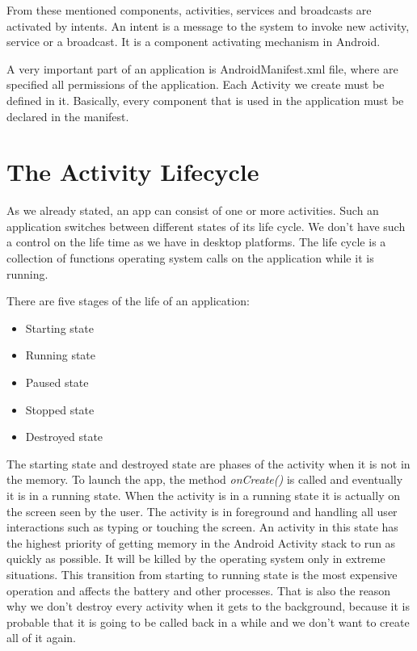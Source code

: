 From these mentioned components, activities, services and broadcasts are activated by intents.
An intent is a message to the system to invoke new activity, service or a broadcast.
It is a component activating mechanism in Android.

A very important part of an application is AndroidManifest\@.xml file, where are specified all permissions of the application.
Each Activity we create must be defined in it. Basically, every component that is used in the application must be declared in the manifest.


\section{The Activity Lifecycle}
As we already stated, an app can consist of one or more activities.
Such an application switches between different states of its life cycle.
We don't have such a control on the life time as we have in desktop platforms.
The life cycle is a collection of functions operating system calls on the application while it is running.

There are five stages of the life of an application:
\begin{itemize}
\item{Starting state}
\item{Running state}
\item{Paused state}
\item{Stopped state}
\item{Destroyed state}
\end{itemize}

The starting state and destroyed state are phases of the activity when it is not in the memory.
To launch the app, the method \emph{onCreate()} is called and eventually it is in a running state.
When the activity is in a running state it is actually on the screen seen by the user.
The activity is in foreground and handling all user interactions such as typing or touching the screen.
An activity in this state has the highest priority of getting memory in the Android Activity stack to run as quickly as possible.
It will be killed by the operating system only in extreme situations.
This transition from starting to running state is the most expensive operation and affects the battery and other processes.
That is also the reason why we don't destroy every activity when it gets to the background, 
because it is probable that it is going to be called back in a while and we don't want to create all of it again.

